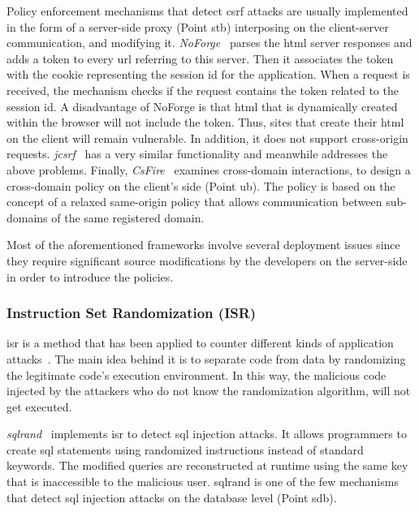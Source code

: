 \documentclass[conference]{IEEEtran}
\begin{document}
Policy enforcement mechanisms that detect {\sc csrf}
attacks are usually implemented in the form of a
server-side proxy (Point {\sc s}t{\sc b})
interposing on the client-server communication, and modifying
it. {\it NoForge}~\cite{JKK06a}
parses the {\sc html} server responses
and adds a token to every {\sc url} referring to this
server. Then it associates the token with the cookie
representing the session {\sc id} for the application.
When a request is received, the mechanism checks
if the request contains the token related
to the session {\sc id}. A disadvantage of NoForge
is that {\sc html} that is dynamically created within
the browser will not include the token.
Thus, sites that create their {\sc html} on the client
will remain vulnerable. In addition, it does not
support cross-origin requests.
{\it j{\sc csrf}}~\cite{PS11}
has a very similar functionality and meanwhile
addresses the above problems.
Finally, {\it CsFire}~\cite{DDHPJ10}
examines cross-domain interactions, to design a
cross-domain policy on the client's side (Point {\sc ub}).
The policy is based on the concept of a relaxed
same-origin policy that allows communication between
sub-domains of the same registered domain.

Most of the aforementioned frameworks involve
several deployment issues since they
require significant source modifications by the
developers on the server-side in order to
introduce the policies.

\subsubsection{Instruction Set Randomization (ISR)}

{\sc isr} is a method that has been applied to counter different kinds
of application attacks~\cite{K09b,KKP03}. The main idea behind it is
to separate code from data by randomizing the legitimate code's
execution environment. In this way, the malicious code injected by the
attackers who do not know the randomization algorithm, will not get
executed.

{\it {\sc sql}rand}~\cite{BK04} implements {\sc isr} to detect {\sc
  sql} injection attacks. It allows programmers to create {\sc sql}
statements using randomized instructions instead of standard keywords.
The modified queries are reconstructed at runtime using the same key
that is inaccessible to the malicious user. {\sc sql}rand is one of
the few mechanisms that detect {\sc sql} injection attacks on the
database level (Point {\sc sdb}).
\end{document}

